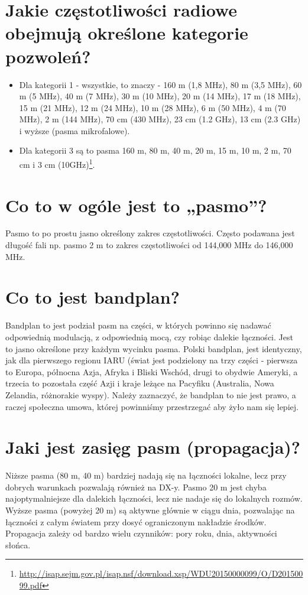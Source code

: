 \documentclass[a4paper,12pt]{article}
\begin{document}
\section{Jakie częstotliwości radiowe obejmują określone kategorie pozwoleń?}
\begin{itemize}
\item Dla kategorii 1 - wszystkie, to znaczy - 160 m (1,8 MHz), 80 m (3,5 MHz), 60 m (5 MHz), 40 m (7 MHz), 30 m (10 MHz), 20 m (14 MHz), 17 m (18 MHz), 15 m (21 MHz), 12 m (24 MHz), 10 m (28 MHz), 6 m (50 MHz), 4 m (70 MHz), 2 m (144 MHz), 70 cm (430 MHz), 23 cm (1.2 GHz), 13 cm (2.3 GHz) i wyższe (pasma mikrofalowe). 
\item Dla kategorii 3 są to pasma 160 m, 80 m, 40 m, 20 m, 15 m, 10 m, 2 m, 70 cm i 3 cm (10GHz)\footnote{\url{http://isap.sejm.gov.pl/isap.nsf/download.xsp/WDU20150000099/O/D20150099.pdf}}.\end{itemize}


\section{Co to w ogóle jest to „pasmo”?}
Pasmo to po prostu jasno określony zakres częstotliwości. Często podawana jest długość fali np. pasmo 2 m to zakres częstotliwości od 144,000 MHz do 146,000 MHz.

\section{Co to jest bandplan?}
Bandplan to jest podział pasm na części, w których powinno się nadawać odpowiednią modulacją, z odpowiednią mocą, czy robiąc dalekie łączności. Jest to jasno określone przy każdym wycinku pasma. 
Polski bandplan, jest identyczny, jak dla pierwszego regionu IARU (świat jest podzielony na trzy części - pierwsza to Europa, północna Azja, Afryka i Bliski Wschód, drugi to obydwie Ameryki, a trzecia to pozostała część Azji i kraje leżące na Pacyfiku (Australia, Nowa Zelandia, różnorakie wyspy). Należy zaznaczyć, że bandplan to nie jest prawo, a raczej społeczna umowa, której powinniśmy przestrzegać aby żyło nam się lepiej. 

\section{Jaki jest zasięg pasm (propagacja)?}
Niższe pasma (80 m, 40 m) bardziej nadają się na łączności lokalne, lecz przy dobrych warunkach pozwalają również na DX-y. Pasmo 20 m jest chyba najoptymalniejsze dla dalekich łączności, lecz nie nadaje się do lokalnych rozmów. Wyższe pasma (powyżej 20 m) są aktywne głównie w ciągu dnia, pozwalając na łączności z całym światem przy dosyć ograniczonym nakładzie środków. Propagacja zależy od bardzo wielu czynników: pory roku, dnia, aktywności słońca. 
\end{document}
